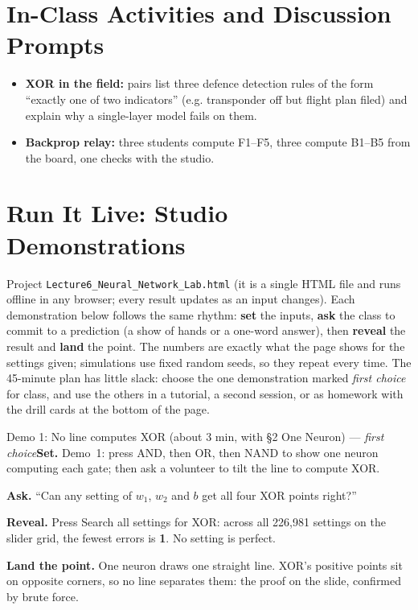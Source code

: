 \documentclass[11pt]{article}
\begin{document}
\section{In-Class Activities and Discussion Prompts}\label{sec:act}\begin{itemize}\item \textbf{XOR in the field:} pairs list three defence detection rules of the form ``exactly one of two indicators'' (e.g. transponder off but flight plan filed) and explain why a single-layer model fails on them.\item \textbf{Backprop relay:} three students compute F1--F5, three compute B1--B5 from the board, one checks with the studio.\end{itemize}

\section{Run It Live: Studio Demonstrations}\label{sec:live}

Project \texttt{Lecture6\_Neural\_Network\_Lab.html} (it is a single HTML file and runs offline in any browser; every result updates as an input changes). Each demonstration below follows the same rhythm: \textbf{set} the inputs, \textbf{ask} the class to commit to a prediction (a show of hands or a one-word answer), then \textbf{reveal} the result and \textbf{land} the point. The numbers are exactly what the page shows for the settings given; simulations use fixed random seeds, so they repeat every time. The 45-minute plan has little slack: choose the one demonstration marked \emph{first choice} for class, and use the others in a tutorial, a second session, or as homework with the drill cards at the bottom of the page.

\begin{live}{Demo 1: No line computes XOR (about 3 min, with \S2 One Neuron) --- \emph{first choice}}\textbf{Set.} Demo~1: press \textsf{AND}, then \textsf{OR}, then \textsf{NAND} to show one neuron computing each gate; then ask a volunteer to tilt the line to compute XOR.\par\smallskip\textbf{Ask.} ``Can any setting of $w_1$, $w_2$ and $b$ get all four XOR points right?''\par\smallskip\textbf{Reveal.} Press \textsf{Search all settings for XOR}: across all 226,981 settings on the slider grid, the fewest errors is \textbf{1}. No setting is perfect.\par\smallskip\textbf{Land the point.} One neuron draws one straight line. XOR's positive points sit on opposite corners, so no line separates them: the proof on the slide, confirmed by brute force.\end{live}
\end{document}

